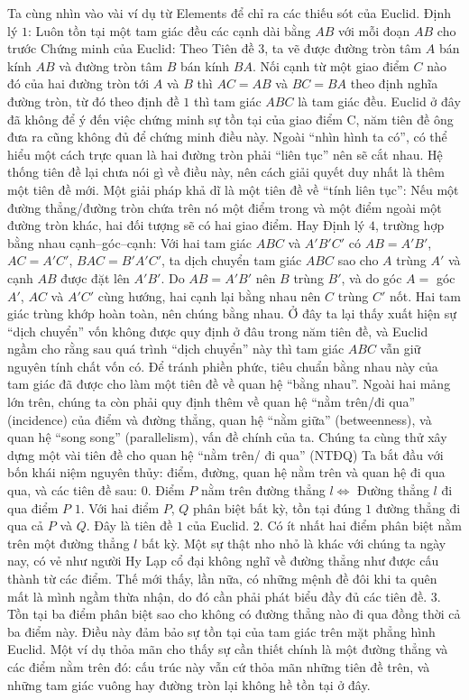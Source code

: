 	\vskip 0.1cm

	Ta cùng nhìn vào vài ví dụ từ Elements để chỉ ra các thiếu sót của Euclid. 
	\vskip 0.1cm
	Định lý $1$: Luôn tồn tại một tam giác đều các cạnh dài bằng $AB$ với mỗi đoạn $AB$ cho trước 
	\vskip 0.1cm
	Chứng minh của Euclid: Theo Tiên đề $3$, ta vẽ được đường tròn tâm $A$ bán kính $AB$ và đường tròn tâm $B$ bán kính $BA$. Nối cạnh từ một giao điểm $C$ nào đó của hai đường tròn tới $A$ và $B$ thì $AC = AB$ và $BC = BA$ theo định nghĩa đường tròn, từ đó theo định đề $1$ thì tam giác $ABC$ là tam giác đều.
	\vskip 0.1cm
Euclid ở đây đã không để ý đến việc chứng minh sự tồn tại của giao điểm C, năm
tiên đề ông đưa ra cũng không đủ để chứng minh điều này. Ngoài ``nhìn hình ta có'', có thể hiểu một cách trực quan là hai đường tròn phải ``liên tục'' nên sẽ cắt nhau. Hệ thống tiên đề lại chưa nói gì về điều này, nên cách giải quyết duy nhất là thêm một tiên đề mới. Một giải pháp khả dĩ là một tiên đề về ``tính liên tục'':	
	\vskip 0.1cm
	Nếu một đường thẳng/đường tròn chứa trên nó một điểm trong và một điểm ngoài một đường tròn khác, hai đối tượng sẽ có hai giao điểm.
	\vskip 0.1cm
	Hay Định lý $4$, trường hợp bằng nhau cạnh--góc--cạnh: Với hai tam giác $ABC$ và $A'B'C'$ có $AB = A'B'$, $AC = A'C'$, $BAC = B'A'C'$, ta dịch chuyển tam giác $ABC$ sao cho $A$ trùng $A'$ và cạnh $AB$ được đặt lên $A'B'$. Do $AB = A'B'$ nên $B$ trùng $B'$, và do góc $A =$ góc $A'$, $AC$ và $A'C'$ cùng hướng, hai cạnh lại bằng nhau nên $C$ trùng $C'$ nốt. Hai tam giác trùng khớp hoàn toàn, nên chúng bằng nhau.
	\vskip 0.1cm
	Ở đây ta lại thấy xuất hiện sự ``dịch chuyển'' vốn không được quy định ở đâu trong năm tiên đề, và Euclid ngầm cho rằng sau quá trình ``dịch chuyển'' này thì tam giác $ABC$ vẫn giữ nguyên tính chất vốn có. Để tránh phiền phức, tiêu chuẩn bằng nhau này của tam giác đã được cho làm một tiên đề về quan hệ ``bằng nhau''.
	\vskip 0.1cm
	Ngoài hai mảng lớn trên, chúng ta còn phải quy định thêm về quan hệ ``nằm trên/đi qua'' (incidence) của điểm và đường thẳng, quan hệ ``nằm giữa'' (betweenness), và quan hệ ``song song'' (parallelism), vấn đề chính của ta. 
	Chúng ta cùng thử xây dựng một vài tiên đề cho quan hệ ``nằm trên/ đi qua'' (NTĐQ)
	\vskip 0.1cm
	Ta bắt đầu với bốn khái niệm nguyên thủy: điểm, đường, quan hệ nằm trên và quan hệ đi qua qua, và các tiên đề sau:
	\vskip 0.1cm
	$0.$ Điểm $P$ nằm trên đường thẳng $l \Leftrightarrow$ Đường thẳng $l$ đi qua điểm $P$
	\vskip 0.1cm
	$1.$ Với hai điểm $P$, $Q$ phân biệt bất kỳ, tồn tại đúng $1$ đường thẳng đi qua cả $P$ và $Q$. Đây là tiên đề $1$ của Euclid.
	\vskip 0.1cm
	$2.$ Có ít nhất hai điểm phân biệt nằm trên một đường thẳng $l$ bất kỳ. Một sự thật nho nhỏ là khác với chúng ta ngày nay, có vẻ như người Hy Lạp cổ đại không nghĩ về đường thẳng như được cấu thành từ các điểm. Thế mới thấy, lần nữa, có những mệnh đề đôi khi ta quên mất là mình ngầm thừa nhận, do đó cần phải phát biểu đầy đủ các tiên đề.
	\vskip 0.1cm
	$3.$ Tồn tại ba điểm phân biệt sao cho không có đường thẳng nào đi qua đồng thời cả ba điểm này. Điều này đảm bảo sự tồn tại của tam giác trên mặt phẳng hình Euclid. Một ví dụ thỏa mãn cho thấy sự cần thiết chính là một đường thẳng và các điểm nằm trên đó: cấu trúc này vẫn cứ thỏa mãn những tiên đề trên, và những tam giác vuông hay đường tròn lại không hề tồn tại ở đây.
	\vskip 0.1cm
	
